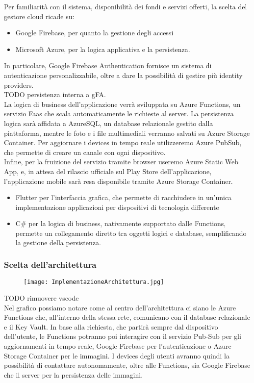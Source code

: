 Per familiarità con il sistema, disponibilità dei fondi e servizi offerti, 
la scelta del gestore cloud ricade su:
\begin{itemize}
    \item Google Firebase, per quanto la gestione degli accessi
    \item Microsoft Azure, per la logica applicativa e la persistenza.
\end{itemize}
In particolare, Google Firebase Authentication fornisce un sistema di autenticazione personalizzabile, 
oltre a dare la possibilità di gestire più identity providers.\\
TODO persistenza interna a gFA.\\
La logica di business dell'applicazione verrà sviluppata su Azure Functions, un servizio Faas che scala automaticamente le richieste al server.
La persistenza logica sarà affidata a AzureSQL, un database relazionale gestito dalla piattaforma, mentre le foto e i file multimediali verranno salvati su Azure Storage Container.
Per aggiornare i devices in tempo reale utilizzeremo Azure PubSub, che permette di creare un canale con ogni dispositivo.\\
Infine, per la fruizione del servizio tramite browser useremo Azure Static Web App, e, in attesa del rilascio ufficiale sul Play Store dell'applicazione, 
l'applicazione mobile sarà resa disponibile tramite Azure Storage Container.\\
\begin{itemize}
    \item Flutter per l'interfaccia grafica, che permette di racchiudere in un'unica implementazione applicazioni per dispositivi di tecnologia differente
    \item C\# per la logica di business, nativamente supportato dalle Functions, permette un collegamento diretto tra oggetti logici e database, semplificando la gestione della persistenza.
\end{itemize}
\pagebreak

\subsubsection{Scelta dell'architettura}
\begin{figure}[h!]
    \begin{center}
        \texttt{[image: ImplementazioneArchitettura.jpg]}
    \end{center}
\end{figure}
TODO rimuovere vscode\\
Nel grafico possiamo notare come al centro dell'architettura ci siano le Azure Functions che, all'interno della stessa rete, comunicano con il database relazionale e il Key Vault.
In base alla richiesta, che partirà sempre dal dispositivo dell'utente, le Functions potranno poi interagire con 
il servizio Pub-Sub per gli aggiornamenti in tempo reale, 
Google Firebase per l'autenticazione o 
Azure Storage Container per le immagini.
I devices degli utenti avranno quindi la possibilità di contattare autonomamente, oltre alle Functions, sia Google Firebase che il server per la persistenza delle immagini. 
\clearpage
